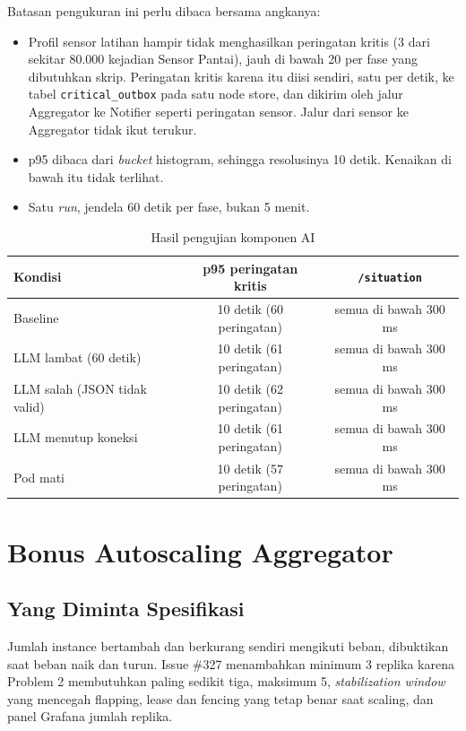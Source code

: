 Batasan pengukuran ini perlu dibaca bersama angkanya:
\begin{itemize}
\item Profil sensor latihan hampir tidak menghasilkan peringatan kritis (3 dari sekitar 80.000 kejadian Sensor Pantai), jauh di bawah 20 per fase yang dibutuhkan skrip. Peringatan kritis karena itu diisi sendiri, satu per detik, ke tabel \texttt{critical\_outbox} pada satu node store, dan dikirim oleh jalur Aggregator ke Notifier seperti peringatan sensor. Jalur dari sensor ke Aggregator tidak ikut terukur.
\item p95 dibaca dari \textit{bucket} histogram, sehingga resolusinya 10 detik. Kenaikan di bawah itu tidak terlihat.
\item Satu \textit{run}, jendela 60 detik per fase, bukan 5 menit.
\end{itemize}

\begin{table}[H]
\caption{Hasil pengujian komponen AI}
\centering\renewcommand{\arraystretch}{1.3}
\begin{tabular}{|l|c|c|}
\hline
\rowcolor{gray!25}\textbf{Kondisi} & \textbf{p95 peringatan kritis} & \textbf{\texttt{/situation}} \\
\hline
Baseline & 10 detik (60 peringatan) & semua di bawah 300 ms \\
\hline
LLM lambat (60 detik) & 10 detik (61 peringatan) & semua di bawah 300 ms \\
\hline
LLM salah (JSON tidak valid) & 10 detik (62 peringatan) & semua di bawah 300 ms \\
\hline
LLM menutup koneksi & 10 detik (61 peringatan) & semua di bawah 300 ms \\
\hline
Pod mati & 10 detik (57 peringatan) & semua di bawah 300 ms \\
\hline
\end{tabular}
\vspace{-12pt}
\end{table}

\section{Bonus Autoscaling Aggregator}\label{sec:bonus-autoscaling}

\subsection{Yang Diminta Spesifikasi}

Jumlah instance bertambah dan berkurang sendiri mengikuti beban, dibuktikan saat beban naik dan turun. Issue \#327 menambahkan minimum 3 replika karena Problem 2 membutuhkan paling sedikit tiga, maksimum 5, \textit{stabilization window} yang mencegah flapping, lease dan fencing yang tetap benar saat scaling, dan panel Grafana jumlah replika.

